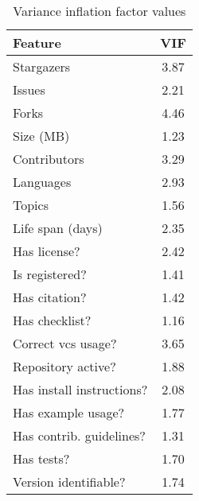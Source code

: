\begin{table}
\centering
\caption{Variance inflation factor values}
\label{tab:vif}
\begin{tabular}{lc}
\toprule
                  Feature &  VIF \\
\midrule
               Stargazers & 3.87 \\
                   Issues & 2.21 \\
                    Forks & 4.46 \\
                Size (MB) & 1.23 \\
             Contributors & 3.29 \\
                Languages & 2.93 \\
                   Topics & 1.56 \\
         Life span (days) & 2.35 \\
             Has license? & 2.42 \\
           Is registered? & 1.41 \\
            Has citation? & 1.42 \\
           Has checklist? & 1.16 \\
       Correct vcs usage? & 3.65 \\
       Repository active? & 1.88 \\
Has install instructions? & 2.08 \\
       Has example usage? & 1.77 \\
 Has contrib. guidelines? & 1.31 \\
               Has tests? & 1.70 \\
    Version identifiable? & 1.74 \\
\bottomrule
\end{tabular}
\end{table}

